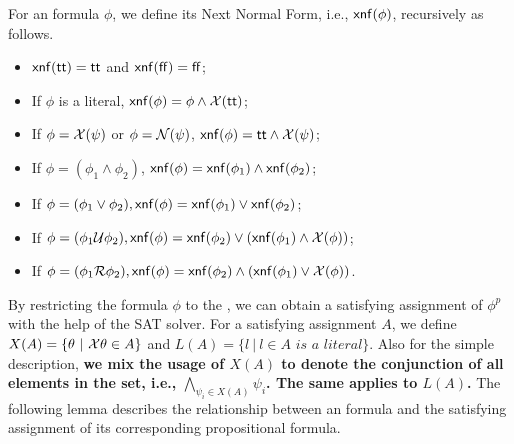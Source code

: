 \begin{definition}\label{def:xnf}
For an \ltlf formula $\phi$, we define its Next Normal Form, i.e., ${\sf xnf}(\phi)$, recursively as follows. 
\begin{itemize}
\item ${\sf xnf}({\sf tt}) = {\sf tt}$ and ${\sf xnf}({\sf ff}) = {\sf ff}$;
\item If $\phi$ is a literal, ${\sf xnf}(\phi) = \phi \wedge \mathcal{X}({\sf tt})$;
\item If $\phi = \mathcal{X}(\psi)$ or $\phi = \mathcal{N}(\psi)$, ${\sf xnf}(\phi) = {\sf tt} \wedge \mathcal{X}(\psi)$;
\item If $\phi = (\phi_1 \wedge \phi_2)$, ${\sf xnf}(\phi) = {\sf xnf}(\phi_1)\wedge{\sf xnf}(\phi_2)$;
\item If $\phi = (\phi_1 \vee \phi_2), {\sf xnf}(\phi) = {\sf xnf}(\phi_1)\vee {\sf xnf}(\phi_2)$; 
\item If $\phi = (\phi_1 \mathcal{U} \phi_2), {\sf xnf}(\phi) = {\sf xnf}(\phi_2) \vee ({\sf xnf}(\phi_1) \wedge \mathcal{X}(\phi))$; 
\item If $\phi = (\phi_1 \mathcal{R} \phi_2), {\sf xnf}(\phi) = {\sf xnf}(\phi_2)\wedge ({\sf xnf}(\phi_1) \vee \mathcal{X}(\phi))$.
\end{itemize}
\end{definition}

By restricting the \ltlf formula $\phi$ to the \XNF, we can obtain a satisfying assignment of $\phi^{p}$ with the help of the SAT solver.
For a satisfying assignment $A$, we define $X(A)=\{\theta\ |\ \mathcal{X}\theta\in A\}$ and $L(A) =\{l\ |\ l \in A \textit{ is a literal}\}$. Also for the simple description, \textbf{we mix the usage of $X(A)$ to denote the conjunction of all elements in the set, i.e., $\bigwedge_{\psi_i\in X(A)}\psi_i$. The same applies to $L(A)$.}
The following lemma describes the relationship between an \ltlf formula and the satisfying assignment of its corresponding propositional formula.

